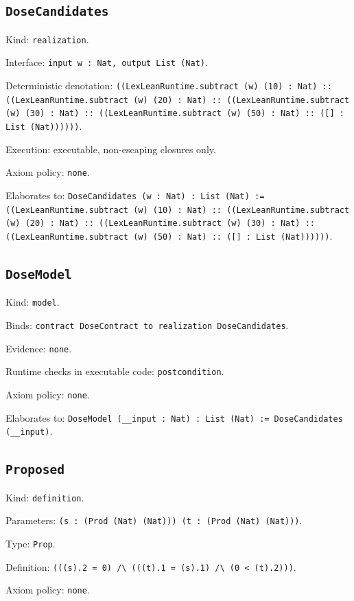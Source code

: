 \documentclass[11pt]{article}
\begin{document}
\subsection*{\texttt{DoseCandidates}}
\noindent Kind: \texttt{realization}.\par
\noindent Interface: \texttt{input w : Nat, output List (Nat)}.\par
\noindent Deterministic denotation: \texttt{((LexLeanRuntime.subtract (w) (10) : Nat) :: ((LexLeanRuntime.subtract (w) (20) : Nat) :: ((LexLeanRuntime.subtract (w) (30) : Nat) :: ((LexLeanRuntime.subtract (w) (50) : Nat) :: ([] : List (Nat))))))}.\par
\noindent Execution: executable, non-escaping closures only.\par
\noindent Axiom policy: \texttt{none}.\par
\noindent Elaborates to: \texttt{DoseCandidates (w : Nat) : List (Nat) := ((LexLeanRuntime.subtract (w) (10) : Nat) :: ((LexLeanRuntime.subtract (w) (20) : Nat) :: ((LexLeanRuntime.subtract (w) (30) : Nat) :: ((LexLeanRuntime.subtract (w) (50) : Nat) :: ([] : List (Nat))))))}.\par
\subsection*{\texttt{DoseModel}}
\noindent Kind: \texttt{model}.\par
\noindent Binds: \texttt{contract DoseContract to realization DoseCandidates}.\par
\noindent Evidence: \texttt{none}.\par
\noindent Runtime checks in executable code: \texttt{postcondition}.\par
\noindent Axiom policy: \texttt{none}.\par
\noindent Elaborates to: \texttt{DoseModel (\_\_input : Nat) : List (Nat) := DoseCandidates (\_\_input)}.\par
\subsection*{\texttt{Proposed}}
\noindent Kind: \texttt{definition}.\par
\noindent Parameters: \texttt{(s : (Prod (Nat) (Nat))) (t : (Prod (Nat) (Nat)))}.\par
\noindent Type: \texttt{Prop}.\par
\noindent Definition: \texttt{(((s).2 = 0) /\textbackslash{} (((t).1 = (s).1) /\textbackslash{} (0 < (t).2)))}.\par
\noindent Axiom policy: \texttt{none}.\par
\end{document}
